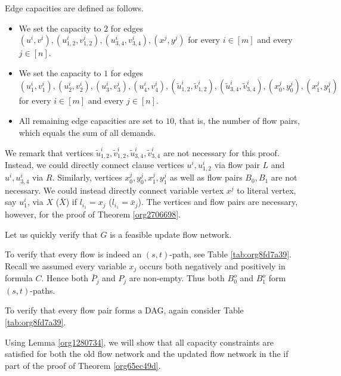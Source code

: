 \documentclass[fontsize=11pt,paper=a4]{book}
\begin{document}
Edge capacities are defined as follows.

\begin{itemize}
\item We set the capacity to \(2\) for edges \((u^i,v^i),(u_{1,2}^i,v_{1,2}^i),(u_{3,4}^i,v_{3,4}^i),(x^j,y^j)\) for every \(i\in[m]\) and every \(j\in[n]\).
\item We set the capacity to \(1\) for edges \((u_1^i,v_1^i),(u_2^i,v_2^i),(u_3^i,v_3^i),(u_4^i,v_4^i),(\tilde{u}_{1,2}^i,\tilde{v}_{1,2}^i),(\tilde{u}_{3,4}^i,\tilde{v}_{3,4}^i),(x_0^j,y_0^j),(x_1^j,y_1^j)\) for every \(i\in[m]\) and every \(j\in[n]\).
\item All remaining edge capacities are set to \(10\), that is, the number of flow pairs, which equals the sum of all demands.
\end{itemize}

We remark that vertices \(\tilde{u}_{1,2}^i,\tilde{v}_{1,2}^i,\tilde{u}_{3,4}^i,\tilde{v}_{3,4}^i\) are not necessary for this proof.
Instead, we could directly connect clause vertices \(u^i,u_{1,2}^i\) via flow pair \(L\) and \(u^i,u_{3,4}^i\) via \(R\).
Similarly, vertices \(x_0^j,y_0^j,x_1^j,y_1^j\) as well as flow pairs \(B_0,B_1\) are not necessary.
We could instead directly connect variable vertex \(x^j\) to literal vertex, say \(u_1^i\), via \(X\) (\(\bar{X}\)) if \(l_{i_1}=x_j\) (\(l_{i_1}=\bar{x}_j\)).
The vertices and flow pairs are necessary, however, for the proof of Theorem \ref{org2706698}.

Let us quickly verify that \(G\) is a feasible update flow network.

To verify that every flow is indeed an \((s,t)\)-path, see Table \ref{tab:org8fd7a39}.
Recall we assumed every variable \(x_j\) occurs both negatively and positively in formula \(C\).
Hence both \(\bar{P}_j\) and \(P_j\) are non-empty.
Thus both \(B_0^o\) and \(B_1^o\) form \((s,t)\)-paths.

To verify that every flow pair forms a DAG, again consider Table \ref{tab:org8fd7a39}.

Using Lemma \ref{org1280734}, we will show that all capacity constraints are satisfied for both the old flow network and the updated flow network in the if part of the proof of Theorem \ref{org65ec49d}.
\end{document}
